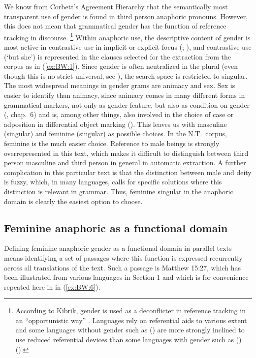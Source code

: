 \documentclass[output=collectionpaper]{langsci/langscibook}
\begin{document}
We know from Corbett’s Agreement Hierarchy that the semantically most transparent use of gender is found in third person anaphoric pronouns. However, this does not mean that grammatical gender has the function of reference tracking in discourse.%
\footnote{%
According to Kibrik, gender is used as a deconflicter in reference tracking in an “opportunistic way” \citet[359]{Kibrik2011}. Languages rely on referential aids to various extent and some languages without gender such as  () are more strongly inclined to use reduced referential devices than some languages with gender such as  () (\citealt[336]{Kibrik2011}).
} %
Within anaphoric use, the descriptive content of gender is most active in contrastive use in implicit or explicit focus (\citealt[227]{Bosch1988}; \citealt[25]{Seifart2018}), and contrastive use (‘but she’) is represented in the clauses selected for the extraction from the corpus as in (\ref{ex:BW:1}). Since gender is often neutralized in the plural (even though this is no strict universal, see \citealt{Plank1997}), the search space is restricted to singular. The most widespread meanings in gender grams are animacy and sex. Sex is easier to identify than animacy, since animacy comes in many different forms in grammatical markers, not only as gender feature, but also as condition on gender (\citealt{Corbett2006}, chap.~6) and is, among other things, also involved in the choice of case or adposition in differential object marking (\citealt[166]{Croft2003}). This leaves us with masculine (singular) and feminine (singular) as possible choices. In the N.T.\ corpus, feminine is the much easier choice. Reference to male beings is strongly overrepresented in this text, which makes it difficult to distinguish between third person masculine and third person in general in automatic extraction. A further complication in this particular text is that the distinction between male and deity is fuzzy, which, in many languages, calls for specific solutions where this distinction is relevant in grammar. Thus, feminine singular in the anaphoric domain is clearly the easiest option to choose.

\subsection{Feminine anaphoric as a functional domain}
\label{sec:BW:2.3}

Defining feminine anaphoric gender as a functional domain in parallel texts means identifying a set of passages where this function is expressed recurrently across all translations of the text. Such a passage is Matthew 15:27, which has been illustrated from various languages in Section 1 and which is for convenience repeated here in  in (\ref{ex:BW:6}).
\end{document}
